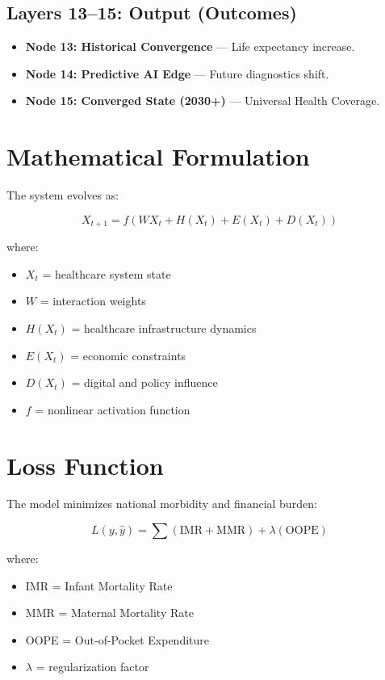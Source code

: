 \documentclass[12pt]{article}
\begin{document}
\subsection{Layers 13–15: Output (Outcomes)}

\begin{itemize}
\item \textbf{Node 13: Historical Convergence} — Life expectancy increase.
\item \textbf{Node 14: Predictive AI Edge} — Future diagnostics shift.
\item \textbf{Node 15: Converged State (2030+)} — Universal Health Coverage.
\end{itemize}

\section{Mathematical Formulation}

The system evolves as:

\[
X_{t+1} = f(WX_t + H(X_t) + E(X_t) + D(X_t))
\]

where:

\begin{itemize}
\item $X_t$ = healthcare system state
\item $W$ = interaction weights
\item $H(X_t)$ = healthcare infrastructure dynamics
\item $E(X_t)$ = economic constraints
\item $D(X_t)$ = digital and policy influence
\item $f$ = nonlinear activation function
\end{itemize}

\section{Loss Function}

The model minimizes national morbidity and financial burden:

\[
L(y, \hat{y}) = \sum (\text{IMR} + \text{MMR}) + \lambda(\text{OOPE})
\]

where:

\begin{itemize}
\item IMR = Infant Mortality Rate
\item MMR = Maternal Mortality Rate
\item OOPE = Out-of-Pocket Expenditure
\item $\lambda$ = regularization factor
\end{itemize}
\end{document}
